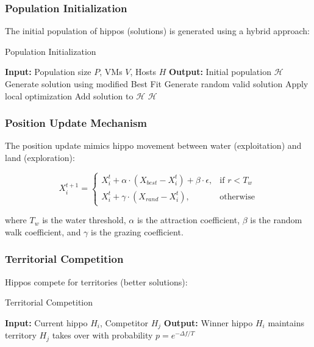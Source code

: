 \documentclass[10pt,conference]{IEEEtran}
\begin{document}
\subsubsection{Population Initialization}

The initial population of hippos (solutions) is generated using a hybrid approach:

\begin{algorithm}
\caption{Population Initialization}
\begin{algorithmic}[1]
\STATE \textbf{Input:} Population size $P$, VMs $V$, Hosts $H$
\STATE \textbf{Output:} Initial population $\mathcal{H}$
        \STATE Generate solution using modified Best Fit
    \ELSE
        \STATE Generate random valid solution
    \ENDIF
    \STATE Apply local optimization
    \STATE Add solution to $\mathcal{H}$
\ENDFOR
\RETURN $\mathcal{H}$
\end{algorithmic}
\end{algorithm}

\subsubsection{Position Update Mechanism}

The position update mimics hippo movement between water (exploitation) and land (exploration):

\begin{equation}
X_i^{t+1} = \begin{cases}
X_i^t + \alpha \cdot (X_{best} - X_i^t) + \beta \cdot \epsilon, & \text{if } r < T_w \\
X_i^t + \gamma \cdot (X_{rand} - X_i^t), & \text{otherwise}
\end{cases}
\end{equation}

where $T_w$ is the water threshold, $\alpha$ is the attraction coefficient, $\beta$ is the random walk coefficient, and $\gamma$ is the grazing coefficient.

\subsubsection{Territorial Competition}

Hippos compete for territories (better solutions):

\begin{algorithm}
\caption{Territorial Competition}
\begin{algorithmic}[1]
\STATE \textbf{Input:} Current hippo $H_i$, Competitor $H_j$
\STATE \textbf{Output:} Winner hippo
    \STATE $H_i$ maintains territory
\ELSE
    \STATE $H_j$ takes over with probability $p = e^{-\Delta f / T}$
\ENDIF
\end{algorithmic}
\end{algorithm}
\end{document}
